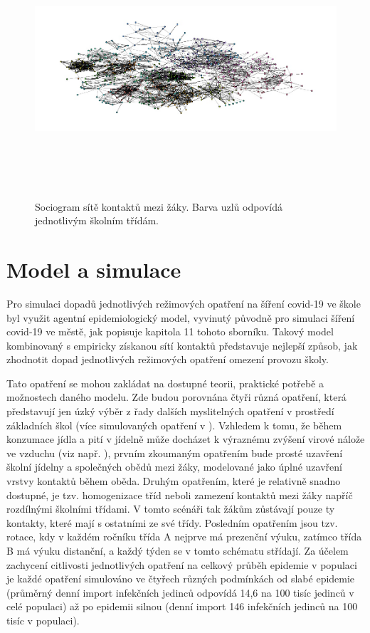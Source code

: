 \begin{figure}[ht]
    \centering
    \includegraphics[width=340pt, height=270pt]{./pic/students_all_classes2.jpg}
    \caption{Sociogram sítě kontaktů mezi žáky. Barva uzlů odpovídá jednotlivým školním třídám.}
    \label{fig:100-teachers}
\end{figure}

\section*{Model a simulace}
Pro simulaci dopadů jednotlivých režimových opatření na šíření covid-19 ve škole byl využit agentní epidemiologický model, vyvinutý původně pro simulaci šíření covid-19 ve městě, jak popisuje kapitola 11 tohoto sborníku. Takový model kombinovaný s empiricky získanou sítí kontaktů představuje nejlepší způsob, jak zhodnotit dopad jednotlivých režimových opatření omezení provozu školy. 

Tato opatření se mohou zakládat na dostupné teorii, praktické potřebě a možnostech daného modelu. Zde budou porovnána čtyři různá opatření, která představují jen úzký výběr z řady dalších myslitelných opatření v prostředí základních škol (více simulovaných opatření v \cite{Brom2021.06.28.21259628}). Vzhledem k tomu, že během konzumace jídla a pití v jídelně může docházet k výraznému zvýšení virové nálože ve vzduchu (viz např. \cite{Chen_etal2020, eichler2021transmission}), prvním zkoumaným opatřením bude prosté uzavření školní jídelny a společných obědů mezi žáky, modelované jako úplné uzavření vrstvy kontaktů během oběda. Druhým opatřením, které je relativně snadno dostupné, je tzv. homogenizace tříd neboli zamezení kontaktů mezi žáky napříč rozdílnými školními třídami. V tomto scénáři tak žákům zůstávají pouze ty kontakty, které mají s ostatními ze své třídy. Posledním opatřením jsou tzv. rotace, kdy v každém ročníku třída A nejprve má prezenční výuku, zatímco třída B má výuku distanční, a každý týden se v tomto schématu střídají. Za účelem zachycení citlivosti jednotlivých opatření na celkový průběh epidemie v populaci je každé opatření simulováno ve čtyřech různých podmínkách od slabé epidemie (průměrný denní import infekčních jedinců odpovídá 14,6 na 100 tisíc jedinců v celé populaci) až po epidemii silnou (denní import 146 infekčních jedinců na 100 tisíc v populaci).

